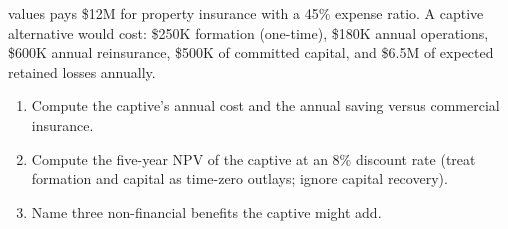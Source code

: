 \documentclass[11pt,openany]{book}
\providecommand{\tightlist}{\setlength{\itemsep}{0pt}\setlength{\parskip}{0pt}}
\begin{document}
\begin{shortanswerquestions}
  values pays \$12M for property insurance with a 45\% expense ratio. A
  captive alternative would cost: \$250K formation (one-time), \$180K annual
  operations, \$600K annual reinsurance, \$500K of committed capital, and
  \$6.5M of expected retained losses annually.
  \begin{enumerate}[label=\alph*)]\tightlist
    \item Compute the captive's annual cost and the annual saving versus
          commercial insurance.
    \item Compute the five-year NPV of the captive at an 8\% discount rate
          (treat formation and capital as time-zero outlays; ignore capital
          recovery).
    \item Name three non-financial benefits the captive might add.
  \end{enumerate}
\end{shortanswerquestions}
\end{document}
